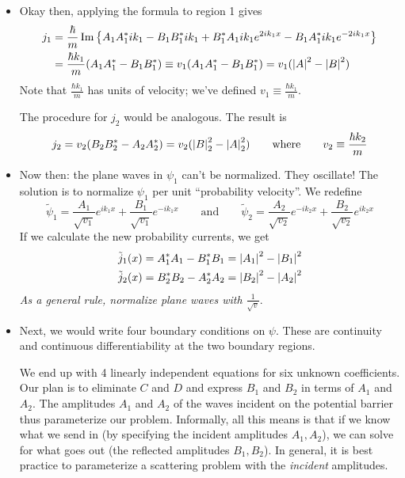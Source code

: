 \documentclass[11pt, a4paper]{article}
\newcommand{\eqtext}[1]{\qquad \text{#1} \qquad}
\begin{document}
\begin{itemize}
	\item Okay then, applying the formula to region 1 gives
	\begin{align*}
		j_{1} &= \frac{\hbar}{m}\Im \left\{A_{1}A_{1}^{*}ik_{1} - B_{1}B_{1}^{*}ik_{1} + B_{1}^{*}A_{1}ik_{1}e^{2ik_{1}x} - B_{1}A_{1}^{*}ik_{1}e^{-2ik_{1}x}\right\}\\
		&=\frac{\hbar k_{1}}{m}(A_{1}A_{1}^{*} - B_{1}B_{1}^{*}) \equiv v_{1}(A_{1}A_{1}^{*} - B_{1}B_{1}^{*}) =  v_{1}(\abs{A}^{2} - \abs{B}^{2})
	\end{align*}
	Note that $ \frac{\hbar k_{1}}{m} $ has units of velocity; we've defined $ v_{1} \equiv \frac{\hbar k_{1}}{m} $. 
	
	The procedure for $ j_{2} $ would be analogous. The result is
	\begin{equation*}
		j_{2} = v_{2}(B_{2}B_{2}^{*} - A_{2}A_{2}^{*}) = v_{2}(\abs{B}_{2}^{2} - \abs{A}_{2}^{2}) \eqtext{where} v_{2} \equiv \frac{\hbar k_{2}}{m}
	\end{equation*}

	
	\item Now then: the plane waves in $ \psi_{1} $ can't be normalized. They oscillate! The solution is to normalize $ \psi_{1} $ per unit ``probability velocity''. We redefine 
	\begin{equation*}
		\tilde{\psi}_{1} = \frac{A_{1}}{\sqrt{v_{1}}} e^{ik_{1}x} + \frac{B_{1}}{\sqrt{v_{1}}}e^{-ik_{1}x} \eqtext{and} \tilde{\psi}_{2} = \frac{A_{2}}{\sqrt{v_{2}}} e^{-ik_{2}x} + \frac{B_{2}}{\sqrt{v_{2}}}e^{ik_{2}x}
	\end{equation*}
	If we calculate the new probability currents, we get
	\begin{align*}
		&\tilde{j}_{1}(x) = A_{1}^{*}A_{1} - B_{1}^{*}B_{1} = \abs{A_{1}}^{2} - \abs{B_{1}}^{2}\\
		&\tilde{j}_{2}(x) = B_{2}^{*}B_{2} - A_{2}^{*}A_{2} = \abs{B_{2}}^{2} - \abs{A_{2}}^{2}
	\end{align*}
	\textit{As a general rule, normalize plane waves with $ \frac{1}{\sqrt{v}} $}.
	
	\item Next, we would write four boundary conditions on $ \psi $. These are continuity and continuous differentiability at the two boundary regions. 
	
	We end up with 4 linearly independent equations for six unknown coefficients. Our plan is to eliminate $ C $ and $ D $ and express $ B_{1} $ and $ B_{2} $ in terms of $ A_{1} $ and $ A_{2} $. The amplitudes $ A_{1} $ and $ A_{2} $ of the waves incident on the potential barrier thus parameterize our problem. Informally, all this means is that if we know what we send in (by specifying the incident amplitudes $ A_{1}, A_{2} $), we can solve for what goes out (the reflected amplitudes $ B_{1}, B_{2} $). In general, it is best practice to parameterize a scattering problem with the \textit{incident} amplitudes. 
	

\end{itemize}
\end{document}
